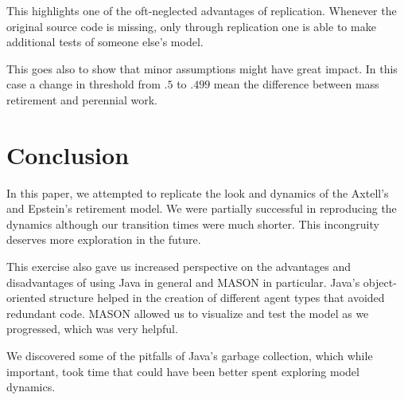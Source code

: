\documentclass[runningheads,a4paper]{article}
\begin{document}
This highlights one of the oft-neglected advantages of replication.
Whenever the original source code is missing, only through replication one is able to make additional tests of someone else's model.

This goes also to show that minor assumptions might have great impact.
In this case a change in threshold from $.5$ to $.499$ mean the difference between mass retirement and perennial work.

\section{Conclusion}

In this paper, we attempted to replicate the look and dynamics of the Axtell's and Epstein's retirement model.
We were partially successful in reproducing the dynamics although our transition times were much shorter.
This incongruity deserves more exploration in the future. 

This exercise also gave us increased perspective on the advantages and disadvantages of using Java in general and MASON in particular.
Java's object-oriented structure helped in the creation of different agent types that avoided redundant code.
MASON allowed us to visualize and test the model as we progressed, which was very helpful.

We discovered some of the pitfalls of Java's garbage collection, which while important, took time that could have been better spent exploring model dynamics.



{
\linespread{1}

}
\end{document}
